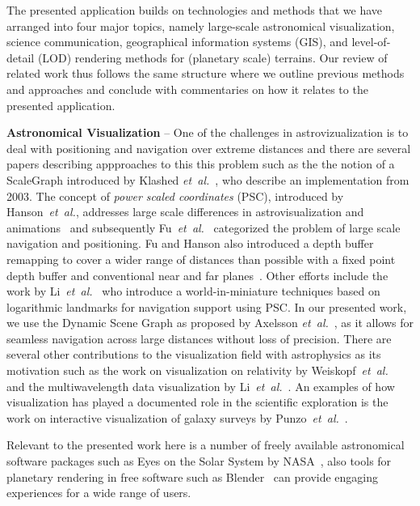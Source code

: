 \documentclass[journal]{vgtc}                %
\newcommand{\etal}{\emph{et~al.}}
\begin{document}
The presented application builds on technologies and methods that we have arranged into four major topics, namely large-scale astronomical visualization, science communication, geographical information systems (GIS), and level-of-detail (LOD) rendering methods for (planetary scale) terrains. Our review of related work thus follows the same structure where we outline previous methods and approaches and conclude with commentaries on how it relates to the presented application.


\noindent\textbf{Astronomical Visualization} --
One of the challenges in astrovizualization is to deal with positioning and navigation over extreme distances and there are several papers describing appproaches to this this problem such as the the notion of a ScaleGraph introduced by Klashed \etal~\cite{KHECY10}, who describe an implementation from 2003. The concept of \emph{power scaled coordinates} (PSC), introduced by Hanson~\etal, addresses large scale differences in astrovisualization and animations~\cite{hanson2000very} and subsequently Fu~\etal~\cite{fu2006navigation} categorized the problem of large scale navigation and positioning. Fu and Hanson also introduced a depth buffer remapping to cover a wider range of distances than possible with a fixed point depth buffer and conventional near and far planes~\cite{fu2007transparently}. Other efforts include the work by Li~\etal~\cite{li2006scalable} who introduce a world-in-miniature techniques based on logarithmic landmarks for navigation support using PSC. In our presented work, we use the Dynamic Scene Graph as proposed by Axelsson \etal~\cite{Axelsson2017Dynamic}, as it allows for seamless navigation across large distances without loss of precision.
There are several other contributions to the visualization field with astrophysics as its motivation such as the work on visualization on relativity by Weiskopf~\etal~\cite{weiskopf2005visualization} and the multiwavelength data visualization by Li~\etal~\cite{li2008visualizing}. An examples of how visualization has played a documented role in the scientific exploration is the work on interactive visualization of galaxy surveys by Punzo~\etal~\cite{punzo2015role}.

Relevant to the presented work here is a number of freely available astronomical software packages such as Eyes on the Solar System by NASA~\cite{hussey2010eyes}, also tools for planetary rendering in free software such as Blender~\cite{kent2013visualizing, naiman2016astroblend} can provide engaging experiences for a wide range of users.
\end{document}
